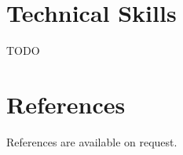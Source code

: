 \documentclass{article}
\begin{document}
\section{Technical Skills}
TODO

\section{References}
References are available on request.
\end{document}
